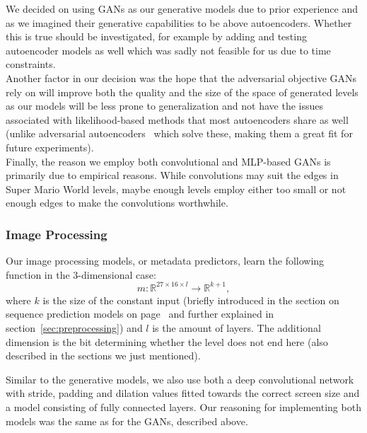 We decided on using GANs as our generative models due to prior
experience and as we imagined their generative capabilities to be
above autoencoders. Whether this is true should be investigated, for
example by adding and testing autoencoder models as well which was
sadly not feasible for us due to time constraints. \\
Another factor in our decision was the hope that the adversarial
objective GANs rely on will improve both the quality and the size of
the space of generated levels as our models will be less prone to
generalization and not have the issues associated with
likelihood-based methods that most autoencoders share as well (unlike
adversarial autoencoders~\cite{makhzaniAdversarialAutoencoders2016}
which solve these, making them a great fit for future experiments). \\
Finally, the reason we employ both convolutional and MLP-based GANs is
primarily due to empirical reasons. While convolutions may suit the
edges in Super Mario World levels, maybe enough levels employ either
too small or not enough edges to make the convolutions worthwhile.

\subsubsection{Image Processing}
\label{sec:image-processing}

Our image processing models, or metadata predictors, learn the
following function in the 3-dimensional case:
\begin{equation*}
  m: \mathbb{R}^{27 \times 16 \times l} \to \mathbb{R}^{k + 1},
\end{equation*}
where $k$ is the size of the constant input (briefly introduced in the
section on sequence prediction models on
page~\pageref{sec:sequence-prediction} and further explained in
section~\ref{sec:preprocessing}) and $l$ is the amount of layers. The
additional dimension is the bit determining whether the level does not
end here (also described in the sections we just mentioned).

Similar to the generative models, we also use both a deep
convolutional network with stride, padding and dilation values fitted
towards the correct screen size and a model consisting of fully
connected layers. Our reasoning for implementing both models was the
same as for the GANs, described above.

